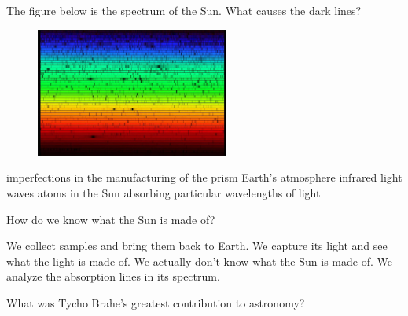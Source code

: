 \documentclass[addpoints]{exam}
\begin{document}
\begin{questions}
\question
The figure below is the spectrum of the Sun. What causes the dark lines?

\begin{figure}[h!]
    \centering
    \includegraphics[width=2.5in]{Figures/Figure5.11.jpg}
\end{figure}

\begin{choices}
    \choice imperfections in the manufacturing of the prism
    \choice Earth's atmosphere 
    \choice infrared light waves
    \correctchoice atoms in the Sun absorbing particular wavelengths of light
\end{choices}



\question
How do we know what the Sun is made of?

\begin{choices}
    \choice We collect samples and bring them back to Earth.
    \choice We capture its light and see what the light is made of.
    \choice We actually don't know what the Sun is made of.
    \correctchoice We analyze the absorption lines in its spectrum.
\end{choices}



\question
What was Tycho Brahe's greatest contribution to astronomy?


\end{questions}
\end{document}
